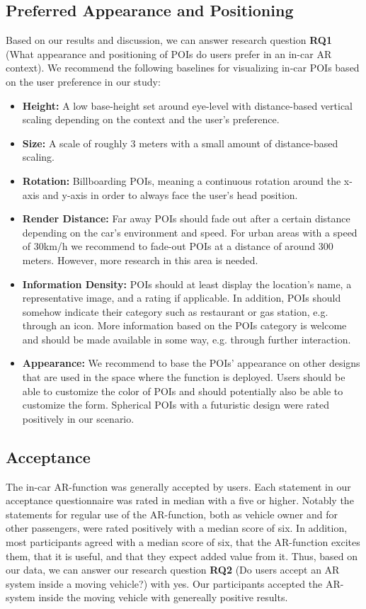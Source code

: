 \subsection{Preferred Appearance and Positioning}
Based on our results and discussion, we can answer research question \textbf{RQ1} (What appearance and positioning of POIs do users prefer in an in-car AR context). We recommend the following baselines for visualizing in-car POIs based on the user preference in our study:
\begin{itemize}
    \item \textbf{Height:} A low base-height set around eye-level with dis\-tance\--based vertical scaling depending on the context and the user's preference.
    \item \textbf{Size:} A scale of roughly 3 meters with a small amount of distance-based scaling.
    \item \textbf{Rotation:} Billboarding POIs, meaning a continuous rotation around the x-axis and y-axis in order to always face the user's head position.
    \item \textbf{Render Distance:} Far away POIs should fade out after a certain distance depending on the car's environment and speed. For urban areas with a speed of 30km/h we recommend to fade-out POIs at a distance of around 300 meters. However, more research in this area is needed.
    \item \textbf{Information Density:} POIs should at least display the location's name, a representative image, and a rating if applicable. In addition, POIs should somehow indicate their category such as restaurant or gas station, e.g. through an icon. More information based on the POIs category is welcome and should be made available in some way, e.g. through further interaction.
    \item \textbf{Appearance:} We recommend to base the POIs' appearance on other designs that are used in the space where the function is deployed. Users should be able to customize the color of POIs and should potentially also be able to customize the form. Spherical POIs with a futuristic design were rated positively in our scenario.
\end{itemize}


\subsection{Acceptance}
The in-car AR-function was generally accepted by users. Each statement in our acceptance questionnaire was rated in median with a five or higher. Notably the statements for regular use of the AR-function, both as vehicle owner and for other passengers, were rated positively with a median score of six. In addition, most participants agreed with a median score of six, that the AR-function excites them, that it is useful, and that they expect added value from it. Thus, based on our data, we can answer our research question \textbf{RQ2} (Do users accept an AR system inside a moving vehicle?) with yes. Our participants accepted the AR-system inside the moving vehicle with genereally positive results.

